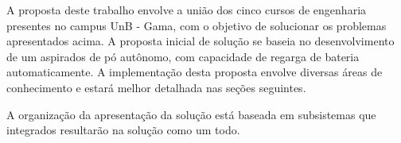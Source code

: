 
A proposta deste trabalho envolve a união dos cinco cursos de engenharia presentes no campus UnB - Gama, com o objetivo de solucionar os problemas apresentados acima. A proposta inicial de solução se baseia no desenvolvimento de um aspirados de pó autônomo, com capacidade de regarga de bateria automaticamente. A implementação desta proposta envolve diversas áreas de conhecimento e estará melhor detalhada nas seções seguintes.

A organização da apresentação da solução está baseada em subsistemas que integrados resultarão na solução como um todo. 


















